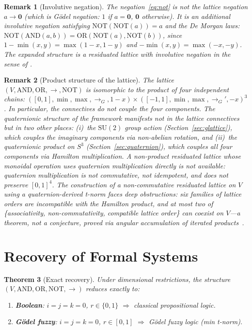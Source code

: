 \documentclass[11pt,a4paper]{article}
\newtheorem{theorem}{Theorem}
\newtheorem{remark}[theorem]{Remark}
\newcommand{\SU}{\mathrm{SU}(2)}
\begin{document}
\begin{remark}[Involutive negation]
\label{rem:negation}
The negation~\eqref{eq:not} is \emph{not} the lattice negation
$a\to\mathbf{0}$ (which is G\"odel negation: $1$ if $a=\mathbf{0}$,
$\mathbf{0}$ otherwise). It is an additional \emph{involutive}
negation satisfying $\mathrm{NOT}(\mathrm{NOT}(a))=a$ and the
De Morgan laws:
$\mathrm{NOT}(\mathrm{AND}(a,b))=\mathrm{OR}(\mathrm{NOT}(a),\mathrm{NOT}(b))$,
since $1-\min(x,y)=\max(1-x,1-y)$ and $-\min(x,y)=\max(-x,-y)$.
The expanded structure is a residuated lattice with involutive
negation in the sense of \citet{esteva2000}.
\end{remark}

\begin{remark}[Product structure of the lattice]
\label{rem:product}
The lattice $(V,\mathrm{AND},\mathrm{OR},\to,\mathrm{NOT})$ is
isomorphic to the product of four independent chains:
$([0,1],\min,\max,\to_G,1{-}x)\times([-1,1],\min,\max,\to_G',{-}x)^3$.
In particular, the connectives do not couple the four components.
The quaternionic structure of the framework manifests not in the
lattice connectives but in two other places: (i)~the $\SU$ group
action (Section~\ref{sec:glattice}), which couples the imaginary
components via non-abelian rotation, and (ii)~the quaternionic
product on $S^3$ (Section~\ref{sec:quaternion}), which couples
all four components via Hamilton multiplication. A non-product
residuated lattice whose monoidal operation uses quaternion
multiplication directly is not available: quaternion multiplication
is not commutative, not idempotent, and does not preserve
$[0,1]^4$. The construction of a non-commutative residuated lattice
on $V$ using a quaternion-derived t-norm faces deep obstructions:
six families of lattice orders are incompatible with the Hamilton
product, and at most two of \{associativity, non-commutativity,
compatible lattice order\} can coexist on $V$---a theorem, not a
conjecture, proved via angular accumulation of iterated
products~\citep{p11_1}.
\end{remark}

\section{Recovery of Formal Systems}
\label{sec:recovery}

\begin{theorem}[Exact recovery]
\label{thm:recovery}
Under dimensional restrictions, the structure $(V,\mathrm{AND},\mathrm{OR},\mathrm{NOT},\to)$ reduces exactly to:
\begin{enumerate}[nosep]
\item \textbf{Boolean}: $i=j=k=0$, $r\in\{0,1\}$
  $\Rightarrow$ classical propositional logic.
\item \textbf{G\"odel fuzzy}: $i=j=k=0$, $r\in[0,1]$
  $\Rightarrow$ G\"odel fuzzy logic (min t-norm).
\end{enumerate}
\end{theorem}
\end{document}
